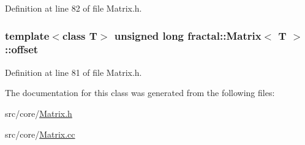 Definition at line 82 of file Matrix.\+h.

\hypertarget{classfractal_1_1Matrix_adc683802129e0fff65fd3fc51d427b29}{
\subsubsection[{offset}]{\setlength{\rightskip}{0pt plus 5cm}template$<$class T$>$ unsigned long {\bf fractal\+::\+Matrix}$<$ T $>$\+::offset\hspace{0.3cm}{\ttfamily [protected]}}}\label{classfractal_1_1Matrix_adc683802129e0fff65fd3fc51d427b29}


Definition at line 81 of file Matrix.\+h.



The documentation for this class was generated from the following files\+:\begin{DoxyCompactItemize}
\item 
src/core/\hyperlink{Matrix_8h}{Matrix.\+h}\item 
src/core/\hyperlink{Matrix_8cc}{Matrix.\+cc}\end{DoxyCompactItemize}
